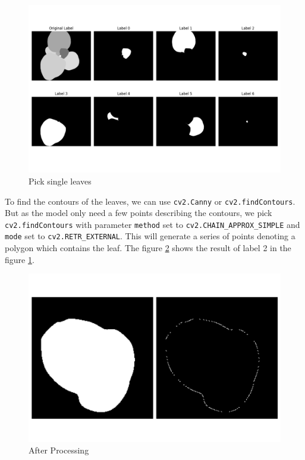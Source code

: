 \documentclass[conference]{IEEEtran}
\begin{document}
\begin{figure}[h!]
    \centering
    \includegraphics[width=\linewidth]{img/conversion_1.png}
    \caption{Pick single leaves}
    \label{fig_conversion_1}
\end{figure}

To find the contours of the leaves, we can use \verb|cv2.Canny| or \verb|cv2.findContours|. But as the model only need a few points describing the contours, we pick \verb|cv2.findContours| with parameter \verb|method| set to \verb|cv2.CHAIN_APPROX_SIMPLE| and \verb|mode| set to \verb|cv2.RETR_EXTERNAL|. This will generate a series of points denoting a polygon which contains the leaf. The figure \ref{fig_conversion_2} shows the result of label 2 in the figure \ref{fig_conversion_1}.

\begin{figure}[h!]
    \centering
    \includegraphics[width=0.75\linewidth]{img/conversion_2_label_2_scaled_up.png}
    \caption{After Processing }
    \label{fig_conversion_2}
\end{figure}
\end{document}

